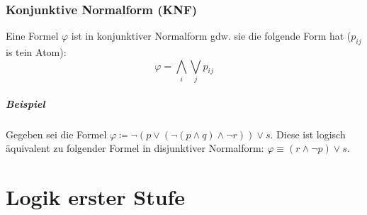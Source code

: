 		\subsection{Konjunktive Normalform (KNF)}
			Eine Formel $ \varphi $ ist in konjunktiver Normalform gdw. sie die folgende Form hat ($ p _ { ij } $ is tein Atom):
			\begin{equation*}
				\varphi = \bigwedge _ i \bigvee _ j p _ { ij }
			\end{equation*}

			\paragraph{Beispiel}
				Gegeben sei die Formel $ \varphi \coloneqq \lnot (p \lor (\lnot (p \land q) \land \lnot r)) \lor s $. Diese ist logisch äquivalent zu folgender Formel in disjunktiver Normalform: $ \varphi \equiv (r \land \lnot p) \lor s $.


\chapter{Logik erster Stufe}
